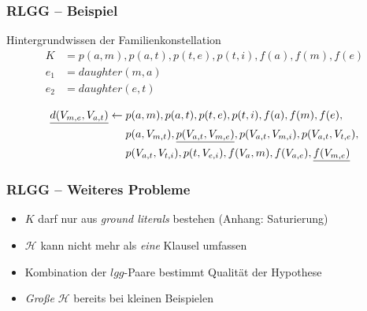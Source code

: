 \begin{frame}
	\frametitle{RLGG -- Beispiel}
	\begin{block}{Hintergrundwissen der Familienkonstellation}
		\begin{align*}
			K   &= p(a,m), p(a,t), p(t,e), p(t,i), f(a), f(m), f(e)\\
			e_1 &= daughter(m, a)\\
			e_2 &= daughter(e, t)
		\end{align*}
	\end{block}

	\begin{gather*}
		\begin{split}
			\emph{d(V_{m,e}, V_{a,t})} \leftarrow &\; p(a,m), p(a,t), p(t,e), p(t,i), f(a), f(m), f(e),\\
			&\; p(a, V_{m,t}), \emph{p(V_{a,t}, V_{m,e})}, p(V_{a,t}, V_{m,i}), p(V_{a,t}, V_{t,e}),\\
			&\; p(V_{a,t}, V_{t,i}) ,p(t, V_{e,i}), f(V_a, m), f(V_{a,e}), \emph{f(V_{m,e})}
		\end{split}
	\end{gather*}
\end{frame}

\begin{frame}
	\frametitle{RLGG -- Weiteres Probleme}
	\begin{itemize}
		\item $K$ darf nur aus \textit{ground literals} bestehen (Anhang: Saturierung)
		\item $\mathcal{H}$ kann nicht mehr als \emph{eine} Klausel umfassen
		\item Kombination der $lgg$-Paare bestimmt Qualität der Hypothese
		\item \emph{Große} $\mathcal{H}$ bereits bei kleinen Beispielen

	\end{itemize}
\end{frame}



